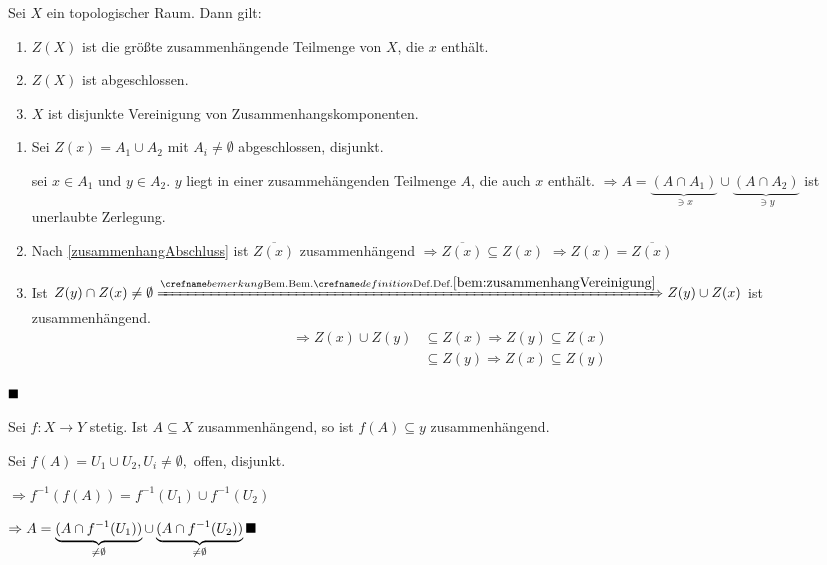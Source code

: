 \begin{bemerkung}
    Sei $X$ ein topologischer Raum. Dann gilt:
    \begin{enumerate}[label=\alph*)]
        \item $Z(X)$ ist die größte zusammenhängende Teilmenge von $X$,
              die $x$ enthält.
        \item $Z(X)$ ist abgeschlossen.
        \item $X$ ist disjunkte Vereinigung von Zusammenhangskomponenten.
    \end{enumerate}
\end{bemerkung}

\begin{beweis}\leavevmode
    \begin{enumerate}[label=\alph*)]
        \item Sei $Z(x) = A_1 \cup A_2$ mit $A_i \neq \emptyset$ abgeschlossen,
              disjunkt.

            \Obda sei $x \in A_1$ und $y \in A_2$. $y$ liegt in einer zusammehängenden
            Teilmenge $A$, die auch $x$ enthält.
            $\Rightarrow A = \underbrace{(A \cap A_1)}_{\ni x} \cup \underbrace{(A \cap A_2)}_{\ni y}$
            ist unerlaubte Zerlegung.
        \item Nach \cref{zusammenhangAbschluss} ist $\overline{Z(x)}$
              zusammenhängend $\Rightarrow \overline{Z(x)} \subseteq Z(x)$
              $\Rightarrow Z(x) = \overline{Z(x)}$
        \item Ist $Z(y) \cap Z(x) \neq \emptyset \xRightarrow{\crefabbr{bem:zusammenhangVereinigung}} Z(y) \cup Z(x)$
              ist zusammenhängend. \\
              \begin{align*}
                \Rightarrow Z(x) \cup Z(y) &\subseteq Z(x) \Rightarrow Z(y) \subseteq Z(x)\\
                                           &\subseteq Z(y) \Rightarrow Z(x) \subseteq Z(y)
              \end{align*} 
    \end{enumerate}

    $\qed$
\end{beweis}

\begin{bemerkung}
    Sei $f:X \rightarrow Y$ stetig. Ist $A \subseteq X$ zusammenhängend,
    so ist $f(A) \subseteq y$ zusammenhängend.
\end{bemerkung}

\begin{beweis}
    Sei $f(A) = U_1 \cup U_2, U_i \neq \emptyset,$ offen, disjunkt.

    $\Rightarrow f^{-1} (f(A)) = f^{-1}(U_1) \cup f^{-1}(U_2)$

    $\Rightarrow A = \underbrace{(A \cap f^{-1}(U_1))}_{\neq \emptyset} \cup \underbrace{(A \cap f^{-1}(U_2))}_{\neq \emptyset} \qed$
\end{beweis}

